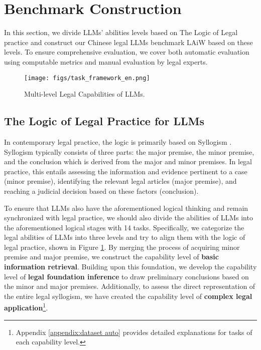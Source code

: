 \section{Benchmark Construction}

In this section, we divide LLMs' abilities levels based on The Logic of Legal practice and construct our Chinese legal LLMs benchmark LAiW based on these levels. To ensure comprehensive evaluation, we cover both automatic evaluation using computable metrics and manual evaluation by legal experts.

\begin{figure}[!htb]
\centering
\texttt{[image: figs/task\_framework\_en.png]} 
\caption{Multi-level Legal Capabilities of LLMs.}
\label{task_framework_en}
\end{figure}

\subsection{ The Logic of Legal Practice for LLMs} 
In contemporary legal practice, the logic is primarily based on Syllogism \cite{wroblewski1974legal, patterson2013logic}. Syllogism typically consists of three parts: the major premise, the minor premise, and the conclusion which is derived from the major and minor premises. In legal practice, this entails assessing the information and evidence pertinent to a case (minor premise), identifying the relevant legal articles (major premise), and reaching a judicial decision based on these factors (conclusion).

To ensure that LLMs also have the aforementioned logical thinking and remain synchronized with legal practice, we should also divide the abilities of LLMs into the aforementioned logical stages with 14 tasks. 
Specifically, we categorize the legal abilities of LLMs into three levels and try to align them with the logic of legal practice, shown in Figure \ref{task_framework_en}. 
By merging the process of acquiring minor premise and major premise, we construct the capability level of \textbf{basic information retrieval}. Building upon this foundation, we develop the capability level of \textbf{legal foundation inference} to draw preliminary conclusions based on the minor and major premises. Additionally, to assess the direct representation of the entire legal syllogism, we have created the capability level of \textbf{complex legal application}\footnote{Appendix \ref{appendix:dataset auto} provides detailed explanations for tasks of each capability level.}.

